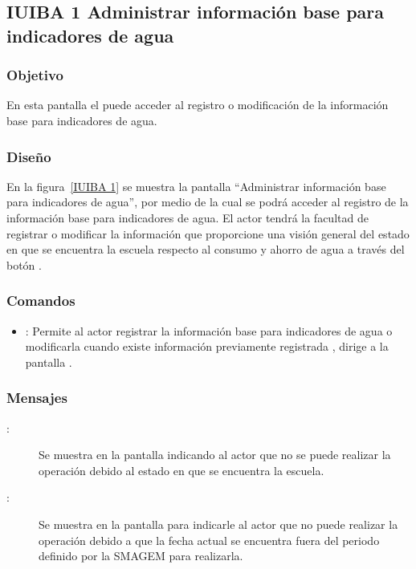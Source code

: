 \subsection{IUIBA 1 Administrar información base para indicadores de agua}

\subsubsection{Objetivo}
	
    En esta pantalla el  puede acceder al registro o modificación de la información base para indicadores de agua.

\subsubsection{Diseño}

    En la figura~\ref{IUIBA 1} se muestra la pantalla ``Administrar información base para indicadores de agua'', por medio de la cual se podrá acceder al registro de la información base para indicadores de agua. El actor tendrá la facultad de registrar o modificar la información que proporcione una visión general del estado en que se encuentra la escuela respecto al consumo y ahorro de agua  a través del botón \botEdit.  



\subsubsection{Comandos}
    \begin{itemize}
	\item {}: Permite al actor registrar la información base para indicadores de agua o modificarla cuando existe información previamente registrada , dirige a la pantalla . 
    \end{itemize}

\subsubsection{Mensajes}

    \begin{description}
	\item [:] Se muestra en la pantalla  indicando al actor que no se puede realizar la operación debido al estado en que se encuentra la escuela.
	
	\item [:] Se muestra en la pantalla  para indicarle al actor que no puede realizar la operación debido a que la fecha actual se encuentra fuera del periodo definido por la SMAGEM para realizarla.
    \end{description}
